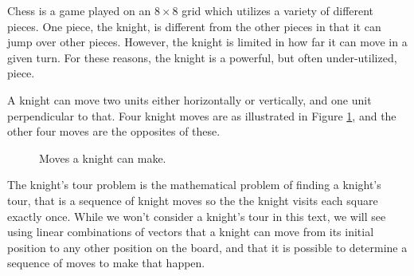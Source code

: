  \label{chap:vector_representation}

\vspace*{-17 pt}

\vspace*{13 pt}

\label{sec:appl_knight}

Chess is a game played on an $8 \times 8$ grid which utilizes a variety of different pieces. One piece, the knight, is different from the other pieces in that it can jump over other pieces. However, the knight is limited in how far it can move in a given turn. For these reasons, the knight is a powerful, but often under-utilized, piece. 

A knight can move two units either horizontally or vertically, and one unit perpendicular to that. Four knight moves are  as illustrated in Figure \ref{F:knight_1}, and the other four moves are the opposites of these. 
\begin{figure}[h]
\begin{center}
\caption{Moves a knight can make.}
\label{F:knight_1}
\end{center}
\end{figure}

The knight's tour problem is the mathematical problem of finding a knight's tour, that is a sequence of knight moves so the the knight visits each square exactly once. While we won't consider a knight's tour in this text, we will see using linear combinations of vectors that a knight can move from its initial position to any other position on the board, and that it is possible to determine a sequence of moves to make that happen.

